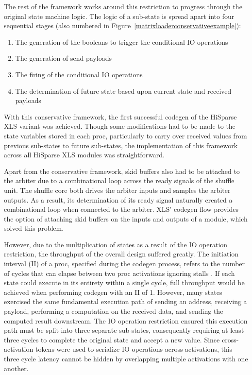 The rest of the framework works around this restriction to progress through the original state machine logic. The logic of a sub-state is spread apart into four sequential stages (also numbered in Figure~\ref{matrixloaderconservativeexample}):

\begin{enumerate}
    \item The generation of the booleans to trigger the conditional IO operations
    \item The generation of send payloads
    \item The firing of the conditional IO operations
    \item The determination of future state based upon current state and received payloads
\end{enumerate}

With this conservative framework, the first successful codegen of the HiSparse XLS variant was achieved. Though some modifications had to be made to the state variables stored in each proc, particularly to carry over received values from previous sub-states to future sub-states, the implementation of this framework across all HiSparse XLS modules was straightforward. 

Apart from the conservative framework, skid buffers also had to be attached to the arbiter due to a combinational loop across the ready signals of the shuffle unit. The shuffle core both drives the arbiter inputs and samples the arbiter outputs. As a result, its determination of its ready signal naturally created a combinational loop when connected to the arbiter. XLS' codegen flow provides the option of attaching skid buffers on the inputs and outputs of a module, which solved this problem.


However, due to the multiplication of states as a result of the IO operation restriction, the throughput of the overall design suffered greatly. The initiation interval (II) of a proc, specified during the codegen process, refers to the number of cycles that can elapse between two proc activations ignoring stalls \cite{xlsweb}. If each state could execute in its entirety within a single cycle, full throughput would be achieved when performing codegen with an II of 1. However, many states exercised the same fundamental execution path of sending an address, receiving a payload, performing a computation on the received data, and sending the computed result downstream. The IO operation restriction ensured this execution path must be split into three separate sub-states, consequently requiring at least three cycles to complete the original state and accept a new value. Since cross-activation tokens were used to serialize IO operations across activations, this three cycle latency cannot be hidden by overlapping multiple activations with one another.

